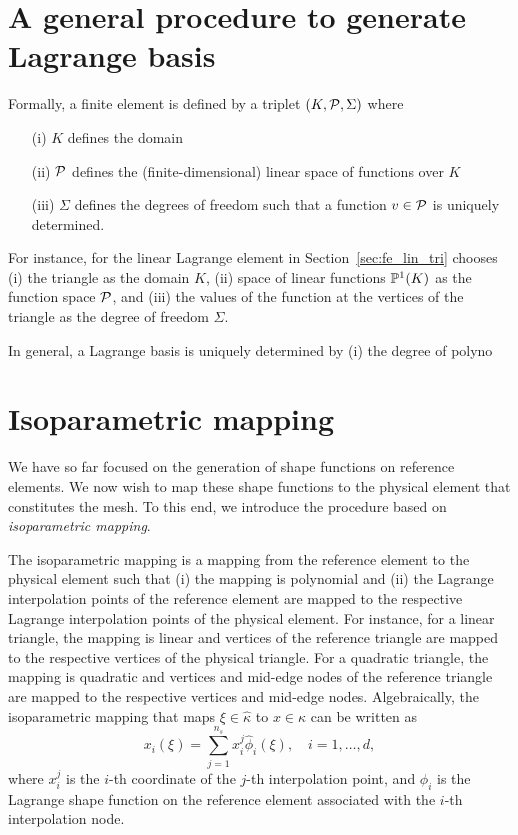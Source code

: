 \section{A general procedure to generate Lagrange basis}
Formally, a finite element is defined by a triplet $(K,\mathcal{P},\Sigma)$ where
\begin{itemize}
\item[(i)] $K$ defines the domain
\item[(ii)] $\mathcal{P}$ defines the (finite-dimensional) linear space of functions over $K$
\item[(iii)] $\Sigma$ defines the degrees of freedom such that a function $v \in \mathcal{P}$ is uniquely determined.
\end{itemize}
For instance, for the linear Lagrange element in Section~\ref{sec:fe_lin_tri} chooses (i) the triangle as the domain $K$, (ii) space of linear functions $\mathbb{P}^1(K)$ as the function space $\mathcal{P}$, and (iii) the values of the function at the vertices of the triangle as the degree of freedom $\Sigma$. 

In general, a Lagrange basis is uniquely determined by (i) the degree of polyno

\section{Isoparametric mapping}
We have so far focused on the generation of shape functions on reference elements.  We now wish to map these shape functions to the physical element that constitutes the mesh.  To this end, we introduce the procedure based on \emph{isoparametric mapping}.

The isoparametric mapping is a mapping from the reference element to the physical element such that (i) the mapping is polynomial and (ii) the Lagrange interpolation points of the reference element are mapped to the respective Lagrange interpolation points of the physical element. For instance, for a linear triangle, the mapping is linear and vertices of the reference triangle are mapped to the respective vertices of the physical triangle.  For a quadratic triangle, the mapping is quadratic and vertices and mid-edge nodes of the reference triangle are mapped to the respective vertices and mid-edge nodes. Algebraically, the isoparametric mapping that maps $\xi \in \hat \kappa$ to $x \in \kappa$ can be written as
\begin{equation}
  x_i(\xi) = \sum_{j=1}^{n_s} x^j_i \hat \phi_i(\xi), \quad i = 1,\dots,d,
  \label{eq:fe_iso_map}
\end{equation}
where $x_i^j$ is the $i$-th coordinate of the $j$-th interpolation point, and $\hat \phi_i$ is the Lagrange shape function on the reference element associated with the $i$-th interpolation node.

